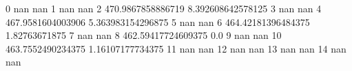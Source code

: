 0 nan nan
1 nan nan
2 470.9867858886719 8.392608642578125
3 nan nan
4 467.9581604003906 5.363983154296875
5 nan nan
6 464.42181396484375 1.82763671875
7 nan nan
8 462.59417724609375 0.0
9 nan nan
10 463.7552490234375 1.16107177734375
11 nan nan
12 nan nan
13 nan nan
14 nan nan
